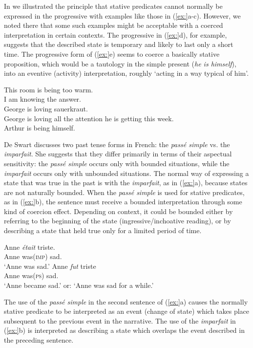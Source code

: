 In  we illustrated the principle that stative predicates cannot normally be expressed in the progressive with examples like those in (\ref{ex:}a-c). However, we noted there that some such examples might be acceptable with a coerced interpretation in certain contexts. The progressive in (\ref{ex:}d), for example, suggests that the described state is temporary and likely to last only a short time. The progressive form of (\ref{ex:}e) seems to coerce a basically stative proposition, which would be a tautology in the simple present (\textit{he is himself}), into an eventive (activity) interpretation, roughly ‘acting in a way typical of him’.


\ea
\ea *This room is being too warm.\\
\ex *I am knowing the answer.\\
\ex *George is loving sauerkraut.\\
\ex George is loving all the attention he is getting this week.\\
\ex Arthur is being himself.
                       \z
\z


De Swart discusses two past tense forms in French: the \textit{passé simple} vs. the \textit{imparfait}. She suggests that they differ primarily in terms of their aspectual sensitivity: the \textit{passé simple} occurs only with bounded situations, while the \textit{imparfait} occurs only with unbounded situations. The normal way of expressing a state that was true in the past is with the \textit{imparfait}, as in (\ref{ex:}a), because states are not naturally bounded. When the \textit{passé simple} is used for stative predicates, as in (\ref{ex:}b), the sentence must receive a bounded interpretation through some kind of coercion effect. Depending on context, it could be bounded either by referring to the beginning of the state (ingressive/inchoative reading), or by describing a state that held true only for a limited period of time.


\ea
\ea \gll  Anne  \textit{était}  triste.\\
Anne  was(\textsc{imp})  sad.\\
\glt ‘Anne was sad.’
\ex \gll Anne  \textit{fut}  triste\\
Anne  was(\textsc{ps})  sad.\\
\glt ‘Anne became sad.’ or: ‘Anne was sad for a while.’
\z \z


The use of the \textit{passé simple} in the second sentence of (\ref{ex:}a) causes the normally stative predicate to be interpreted as an event (change of state) which takes place subsequent to the previous event in the narrative. The use of the \textit{imparfait} in (\ref{ex:}b) is interpreted as describing a state which overlaps the event described in the preceding sentence.



